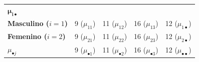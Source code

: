 \documentclass[]{book}
\theoremstyle{definition}
\theoremstyle{definition}
\theoremstyle{definition}
\theoremstyle{remark}
\begin{document}
\begin{longtable}[]{@{}lllll@{}}
\begin{minipage}[t]{0.17\columnwidth}
\(\mathbf{\mu_{i\bullet}}\)\strut
\end{minipage}\tabularnewline
\begin{minipage}[t]{0.15\columnwidth}\raggedright
\textbf{Masculino (\(i = 1\))}\strut
\end{minipage} & \begin{minipage}[t]{0.26\columnwidth}\raggedright
9 (\(\mu_{11}\))\strut
\end{minipage} & \begin{minipage}[t]{0.15\columnwidth}\raggedright
11 (\(\mu_{12}\))\strut
\end{minipage} & \begin{minipage}[t]{0.12\columnwidth}\raggedright
16 (\(\mu_{13}\))\strut
\end{minipage} & \begin{minipage}[t]{0.17\columnwidth}\raggedright
12 (\(\mu_{1\bullet}\))\strut
\end{minipage}\tabularnewline
\begin{minipage}[t]{0.15\columnwidth}\raggedright
\textbf{Femenino (\(i = 2\))}\strut
\end{minipage} & \begin{minipage}[t]{0.26\columnwidth}\raggedright
9 (\(\mu_{21}\))\strut
\end{minipage} & \begin{minipage}[t]{0.15\columnwidth}\raggedright
11 (\(\mu_{22}\))\strut
\end{minipage} & \begin{minipage}[t]{0.12\columnwidth}\raggedright
16 (\(\mu_{23}\))\strut
\end{minipage} & \begin{minipage}[t]{0.17\columnwidth}\raggedright
12 (\(\mu_{2\bullet}\))\strut
\end{minipage}\tabularnewline
\begin{minipage}[t]{0.15\columnwidth}\raggedright
\textbf{\(\mu_{\bullet j}\)}\strut
\end{minipage} & \begin{minipage}[t]{0.26\columnwidth}\raggedright
9 (\(\mu_{\bullet1}\))\strut
\end{minipage} & \begin{minipage}[t]{0.15\columnwidth}\raggedright
11 (\(\mu_{\bullet2}\))\strut
\end{minipage} & \begin{minipage}[t]{0.12\columnwidth}\raggedright
16 (\(\mu_{\bullet3}\))\strut
\end{minipage} & \begin{minipage}[t]{0.17\columnwidth}\raggedright
12 (\(\mu_{\bullet\bullet}\))\strut
\end{minipage}\tabularnewline
\bottomrule
\end{longtable}
\end{document}

